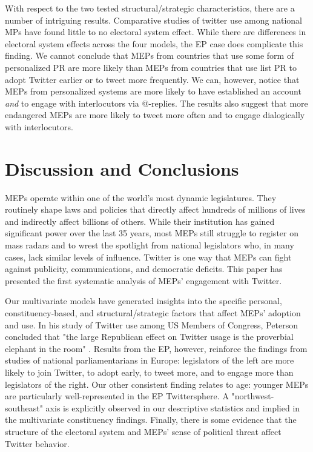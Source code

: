 \documentclass[12pt]{article}\usepackage[]{graphicx}\usepackage[]{color}
\begin{document}
	With respect to the two tested structural/strategic characteristics, there are a number of intriguing results. Comparative studies of twitter use among national MPs have found little to no electoral system effect. While there are differences in electoral system effects across the four models, the EP case does complicate this finding. We cannot conclude that MEPs from countries that use some form of personalized PR are more likely than MEPs from countries that use list PR to adopt Twitter earlier or to tweet more frequently. We can, however, notice that MEPs from personalized systems are more likely to have established an account \emph{and} to engage with interlocutors via @-replies.  The results also suggest that more endangered MEPs are more likely to tweet more often and to engage dialogically with interlocutors.  

\section*{Discussion and Conclusions}

	MEPs operate within one of the world's most dynamic legislatures. They routinely shape laws and policies that directly affect hundreds of millions of lives and indirectly affect billions of others. While their institution has gained significant power over the last 35 years, most MEPs still struggle to register on mass radars and to wrest the spotlight from national legislators who, in many cases, lack similar levels of influence. Twitter is one way that MEPs can fight against publicity, communications, and democratic deficits.  This paper has presented the first systematic analysis of MEPs' engagement with Twitter.

	 Our multivariate models have generated insights into the specific personal, constituency-based, and structural/strategic factors that affect MEPs' adoption and use. In his study of Twitter use among US Members of Congress, Peterson concluded that "the large Republican effect on Twitter usage is the proverbial elephant in the room" \cite{peterson.2012}. Results from the EP, however, reinforce the findings from studies of national parliamentarians in Europe: legislators of the left are more likely to join Twitter, to adopt early, to tweet more, and to engage more than legislators of the right. Our other consistent finding relates to age: younger MEPs are particularly well-represented in the EP Twittersphere. A "northwest-southeast" axis is explicitly observed in our descriptive statistics and implied in the multivariate constituency findings.  Finally, there is some evidence that the structure of the electoral system and MEPs' sense of political threat affect Twitter behavior. 
	 
\end{document}
